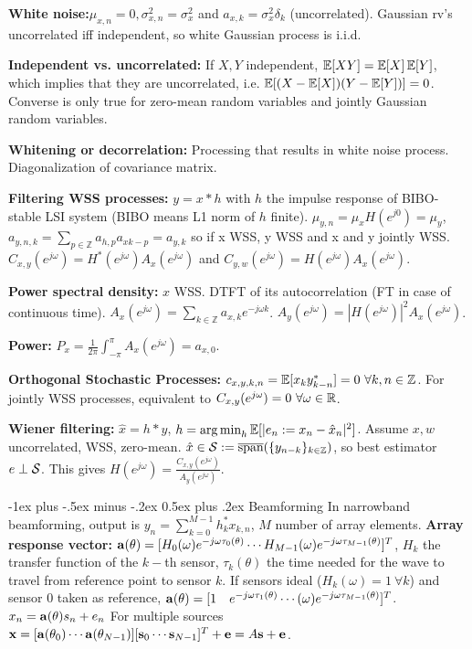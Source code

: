 \documentclass{article}
\makeatletter
\renewcommand{\section}{\@startsection{section}{1}{0mm}%
                                {-1ex plus -.5ex minus -.2ex}%
                                {0.5ex plus .2ex}%
                                {\color{blue!60}\normalfont\normalsize\bfseries}}
\makeatother
\begin{document}
\begin{multicols*}{3}
    \textbf{White noise:}$\mu_{x,n}=0,\sigma^2_{x,n}=\sigma_x^2$ and $a_{x,k}=\sigma_x^2\delta_k$ (uncorrelated). Gaussian rv's uncorrelated iff independent, so white Gaussian process is i.i.d.
    
    \textbf{Independent vs. uncorrelated: }If $X,Y$ independent, $\E[XY]=\E[X]\E[Y]$, which implies that they are uncorrelated, i.e. $\E[(X-\E[X])(Y-\E[Y])]=0$. Converse is only true for zero-mean random variables and jointly Gaussian random variables.
    
    \textbf{Whitening or decorrelation: }Processing that results in white noise process. Diagonalization of covariance matrix.
    
    \textbf{Filtering WSS processes: }$y=x\ast h$ with $h$ the impulse response of BIBO-stable LSI system (BIBO means L1 norm of $h$ finite). $\mu_{y,n}=\mu_xH(e^{j0})=\mu_y$, $a_{y,n,k}=\sum_{p\in\mathbb{Z}}a_{h,p}a_{xk-p}=a_{y,k}$ so if x WSS, y WSS and x and y jointly WSS. $C_{x,y}(e^{j\omega})=H^*(e^{j\omega})A_x(e^{j\omega})$ and $C_{y,w}(e^{j\omega})=H(e^{j\omega})A_x(e^{j\omega})$.
    
    \textbf{Power spectral density: }$x$ WSS. DTFT of its autocorrelation (FT in case of continuous time). $A_x(e^{j\omega})=\sum_{k\in\mathbb{Z}}a_{x,k}e^{-j\omega k}$.
    $A_y(e^{j\omega})=|H(e^{j\omega})|^2A_x(e^{j\omega})$.
    
    \textbf{Power: }$P_x=\frac{1}{2\pi}\int_{-\pi}^\pi A_x(e^{j\omega})=a_{x,0}$.
    
    \textbf{Orthogonal Stochastic Processes: }$c_{x,y,k,n}=\E[x_ky_{k-n}^*]=0\ \forall k,n\in\mathbb{Z}$. For jointly WSS processes, equivalent to $C_{x,y}(e^{j\omega})=0\ \forall\omega\in\R$.
    
    \textbf{Wiener filtering: }$\hat{x}=h\ast y$, $h=\argmin_h \E[|e_n:=x_n-\hat{x}_n|^2]$. Assume $x,w$ uncorrelated, WSS, zero-mean. $\hat{x}\in \cS:=\overline{\text{span}}(\{y_{n-k}\}_{k\in\mathbb{Z}})$, so best estimator $e\perp \cS$. This gives $H(e^{j\omega})=\frac{C_{x,y}(e^{j\omega})}{A_y(e^{j\omega})}$.
    
    \section{Beamforming}
    In narrowband beamforming, output is $y_n=\sum_{k=0}^{M-1}h_k^* x_{k,n}$, $M$ number of array elements.
    \textbf{Array response vector: }$\aa(\theta)=[H_0(\omega)e^{-j\omega\tau_0(\theta)}\cdots H_{M-1}(\omega)e^{-j\omega\tau_{M-1}(\theta)}]^T$, $H_k$ the transfer function of the $k-$th sensor, $\tau_k(\theta)$ the time needed for the wave to travel from reference point to sensor $k$. If sensors ideal ($H_k(\omega)=1\ \forall k$) and sensor 0 taken as reference, $\aa(\theta)=[1\quad e^{-j\omega\tau_1(\theta)}\cdots(\omega)e^{-j\omega\tau_{M-1}(\theta)}]^T$. $x_n=\aa(\theta)s_n+e_n$ For multiple sources $\xx=[\aa(\theta_0)\cdots \aa(\theta_{N-1})][\ss_0\cdots \ss_{N-1}]^T + \ee = A\ss + \ee$.
    

\end{multicols*}
\end{document}
